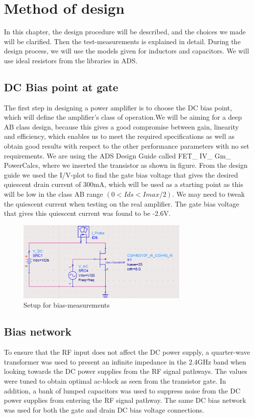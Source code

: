 \chapter{Method of design}
  In this chapter, the design procedure will be described, and the choices we made will be clarified. Then the test-measurements is explained in detail. During the design process, we will use the models given for inductors and capacitors. We will use ideal resistors from the libraries in ADS.
  \section{DC Bias point at gate}
    The first step in designing a power amplifier is to choose the DC bias point, which will define the amplifier’s class of operation.We will be aiming for a deep AB class design, because this gives a good compromise between gain, linearity and efficiency, which enables us to meet the required specifications as well as obtain good results with respect to the other performance parameters with no set requirements.
    We are using the ADS Design Guide called FET\_ IV\_ Gm\_ PowerCalcs, where we inserted the transistor as shown in figure. From the design guide we used the I/V-plot to find the gate bias voltage that gives the desired quiescent drain current of 300mA, which will be used as a starting point as this will be low in the class AB range $(0 < Ids < Imax/2)$. We may need to tweak the quiescent current when testing on the real amplifier. The gate bias voltage that gives this quiescent current was found  to be -2.6V.

  \begin{figure}[h]
	  \centering
	  \includegraphics[width=0.75\textwidth]{img/IV_simulation}
	  \caption{Setup for bias-measurements}
	  \label{fig:fig_bias_sim}
  \end{figure}

  \section{Bias network}
  To ensure that the RF input does not affect the DC power supply, a quarter-wave transformer was used to present an infinite impedance in the 2.4GHz band when looking towards the DC power supplies from the RF signal pathways. The values were tuned to obtain optimal ac-block as seen from the transistor gate. In addition, a bank of lumped capacitors was used to suppress noise from the DC power supplies from entering the RF signal pathway. The same DC bias network was used for both the gate and drain DC bias voltage connections.
  
